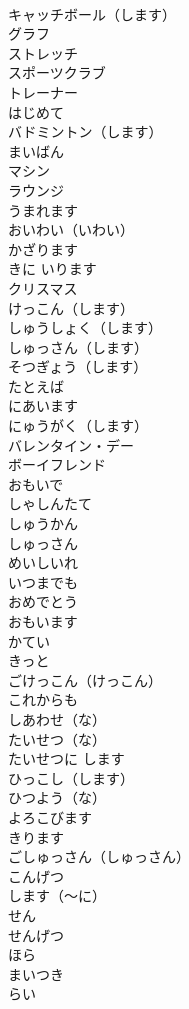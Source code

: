 \documentclass[8pt]{extreport}
\begin{document}
\begin{CJK}{UTF8}{min}
\\	キャッチボール（します）	
\\	グラフ	
\\	ストレッチ	
\\	スポーツクラブ	
\\	トレーナー	
\\	はじめて	
\\	バドミントン（します）	
\\	まいばん	
\\	マシン	
\\	ラウンジ	
\\	うまれます	
\\	おいわい（いわい）	
\\	かざります	
\\	きに いります	
\\	クリスマス	
\\	けっこん（します）	
\\	しゅうしょく（します）	
\\	しゅっさん（します）	
\\	そつぎょう（します）	
\\	たとえば	
\\	にあいます	
\\	にゅうがく（します）	
\\	バレンタイン・デー	
\\	ボーイフレンド	
\\	おもいで	
\\	しゃしんたて	
\\	しゅうかん	
\\	しゅっさん	
\\	めいしいれ	
\\	いつまでも	
\\	おめでとう	
\\	おもいます	
\\	かてい	
\\	きっと	
\\	ごけっこん（けっこん）	
\\	これからも	
\\	しあわせ（な）	
\\	たいせつ（な）	
\\	たいせつに します	
\\	ひっこし（します）	
\\	ひつよう（な）	
\\	よろこびます	
\\	きります	
\\	ごしゅっさん（しゅっさん）	
\\	こんげつ	
\\	します（～に）	
\\	せん	
\\	せんげつ	
\\	ほら	
\\	まいつき	
\\	らい	
\end{CJK}
\end{document}
